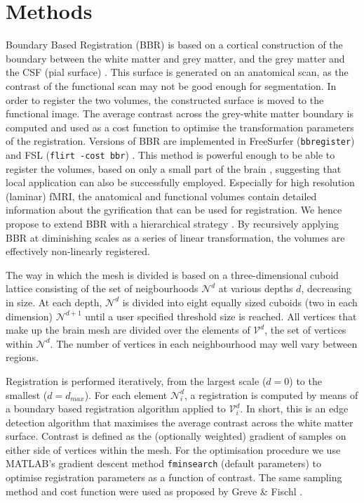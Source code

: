 \section{Methods}
Boundary Based Registration (BBR) is based on a cortical construction of the boundary between the white matter and grey matter, and the grey matter and the CSF (pial surface) \cite{Greve2009}. This surface is generated on an anatomical scan, as the contrast of the functional scan may not be good enough for segmentation. In order to register the two volumes, the constructed surface is moved to the functional image. The average contrast across the grey-white matter boundary is computed and used as a cost function to optimise the transformation parameters of the registration. Versions of BBR are implemented in FreeSurfer (\texttt{bbregister}) \cite{Dale1999} and FSL (\texttt{flirt -cost bbr}) \cite{Jenkinson2001}. This method is powerful enough to be able to register the volumes, based on only a small part of the brain \cite{Greve2009}, suggesting that local application can also be successfully employed. Especially for high resolution (laminar) fMRI, the anatomical and functional volumes contain detailed information about the gyrification that can be used for registration. We hence propose to extend BBR with a hierarchical strategy \cite{Collins1995}. By recursively applying BBR at diminishing scales as a series of linear transformation, the volumes are effectively non-linearly registered.

The way in which the mesh is divided is based on a three-dimensional cuboid lattice consisting of the set of neigbourhoods $\mathcal{N}^{d}$ at various depths $d$, decreasing in size. At each depth, $\mathcal{N}^{d}$ is divided into eight equally sized cuboids (two in each dimension) $\mathcal{N}^{d + 1}$ until a user specified threshold size is reached. All vertices that make up the brain mesh are divided over the elements of $\mathcal{V}^{d}$, the set of vertices within $\mathcal{N}^{d}$. The number of vertices in each neighbourhood may well vary between regions.

Registration is performed iteratively, from the largest scale ($d=0$) to the smallest ($d=d_{max}$). For each element $\mathcal{N}_{i}^{d}$, a registration is computed by means of a boundary based registration algorithm \cite{Greve2009} applied to $\mathcal{V}_{i}^{d}$. In short, this is an edge detection algorithm that maximises the average contrast across the white matter surface. Contrast is defined as the (optionally weighted) gradient of samples on either side of vertices within the mesh. For the optimisation procedure we use MATLAB's gradient descent method \texttt{fminsearch} (default parameters) to optimise registration parameters as a function of contrast. The same sampling method and cost function were used as proposed by Greve \& Fischl \cite{Greve2009}.

